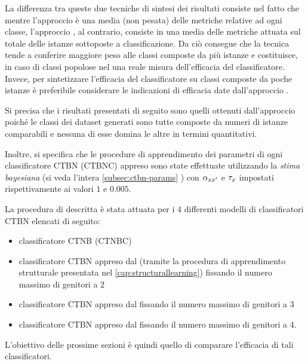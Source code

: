 La differenza tra queste due tecniche di sintesi dei risultati consiste nel fatto che mentre l'approccio \emph{} è una media (non pesata) delle metriche relative ad ogni classe, l'approccio \emph{}, al contrario, consiste in una media delle metriche attuata sul totale delle istanze sottoposte a classificazione. Da ciò consegue che la tecnica \emph{} tende a conferire maggiore peso alle classi composte da più istanze e costituisce, in caso di classi popolose nel \emph{} una reale misura dell'efficacia del classificatore. Invece, per sintetizzare l'efficacia del classificatore su classi composte da poche istanze è preferibile considerare le indicazioni di efficacia date dall'approccio \emph{} \citep[si veda][sezione 13.6]{Manning2008}.

Si precisa che i risultati presentati di seguito sono quelli ottenuti dall'approccio \emph{} poiché le classi dei dataset generati sono tutte composte da numeri di istanze comparabili e nessuna di esse domina le altre in termini quantitativi.

Inoltre, si specifica che le procedure di apprendimento dei parametri di ogni classificatore \acs{CTBN} (\acs{CTBNC}) appreso sono state effettuate utilizzando la \emph{stima bayesiana} (si veda l'intera \autoref{subsec:ctbn-params} ) con  $\alpha_{\mathnormal{x}\mathnormal{x}^{\prime}}$ e $\tau_{\mathnormal{x}}$ impostati rispettivamente ai valori $1$ e $0.005$.

La procedura di  descritta è stata attuata per i $4$ differenti modelli di classificatori \acs{CTBN} elencati di seguito:
\begin{itemize}
	\item classificatore \acs{CTNB} (\acs{CTNBC})
	\item classificatore \acs{CTBN} appreso dal \emph{} (tramite la procedura di apprendimento strutturale presentata nel \vref{cap:structurallearning}) fissando il numero massimo di genitori a $2$
	\item classificatore \acs{CTBN} appreso dal \emph{} fissando il numero massimo di genitori a $3$
	\item classificatore \acs{CTBN} appreso dal \emph{} fissando il numero massimo di genitori a $4$.
\end{itemize}
L'obiettivo delle prossime sezioni è quindi quello di comparare l'efficacia di tali classificatori.

